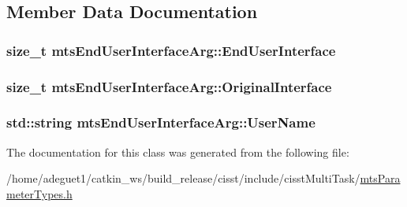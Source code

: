 \subsection{Member Data Documentation}
\hypertarget{classmts_end_user_interface_arg_a3eede0e50dd9601400c62f6d545ffa79}{
\subsubsection[{End\-User\-Interface}]{\setlength{\rightskip}{0pt plus 5cm}size\-\_\-t mts\-End\-User\-Interface\-Arg\-::\-End\-User\-Interface}}\label{classmts_end_user_interface_arg_a3eede0e50dd9601400c62f6d545ffa79}
\hypertarget{classmts_end_user_interface_arg_afcb9d3b4e1fa81a772d60480519232e6}{
\subsubsection[{Original\-Interface}]{\setlength{\rightskip}{0pt plus 5cm}size\-\_\-t mts\-End\-User\-Interface\-Arg\-::\-Original\-Interface}}\label{classmts_end_user_interface_arg_afcb9d3b4e1fa81a772d60480519232e6}
\hypertarget{classmts_end_user_interface_arg_a0698eac4ba5458816ef097e6094c1036}{
\subsubsection[{User\-Name}]{\setlength{\rightskip}{0pt plus 5cm}std\-::string mts\-End\-User\-Interface\-Arg\-::\-User\-Name}}\label{classmts_end_user_interface_arg_a0698eac4ba5458816ef097e6094c1036}


The documentation for this class was generated from the following file\-:\begin{DoxyCompactItemize}
\item 
/home/adeguet1/catkin\-\_\-ws/build\-\_\-release/cisst/include/cisst\-Multi\-Task/\hyperlink{mts_parameter_types_8h}{mts\-Parameter\-Types.\-h}\end{DoxyCompactItemize}

